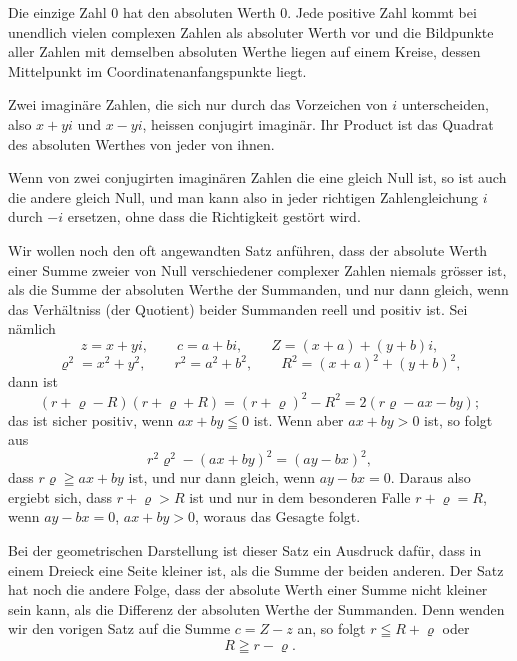 
Die einzige Zahl $0$ hat den absoluten Werth $0$. Jede positive Zahl
kommt bei unendlich vielen complexen Zahlen als absoluter Werth vor und
die Bildpunkte aller Zahlen mit demselben absoluten Werthe liegen auf
einem Kreise, dessen Mittelpunkt im Coordinatenanfangspunkte liegt.

Zwei imaginäre Zahlen, die sich nur durch das Vorzeichen von $i$
unterscheiden, also $x+yi$ und $x-yi$, heissen conjugirt imaginär. Ihr
Product ist das Quadrat des absoluten Werthes von jeder von ihnen.

Wenn von zwei conjugirten imaginären Zahlen die eine gleich Null ist,
so ist auch die andere gleich Null, und man kann also in jeder
richtigen Zahlengleichung $i$ durch $-i$ ersetzen, ohne dass die
Richtigkeit gestört wird.

Wir wollen noch den oft angewandten Satz anführen, dass der absolute
Werth einer Summe zweier von Null verschiedener complexer Zahlen
niemals grösser ist, als die Summe der absoluten Werthe der Summanden,
und nur dann gleich, wenn das Verhältniss (der Quotient) beider
Summanden reell und positiv ist. Sei nämlich
\[
 z=x+yi,
 \qquad c=a+bi,
 \qquad Z=(x+a)+(y+b)i,
\]
\[
 \varrho^2=x^2+y^2,
 \qquad r^2=a^2+b^2,
 \qquad R^2=(x+a)^2+(y+b)^2,
\]
dann ist
\[
 (r+\varrho-R)(r+\varrho+R)
   =(r+\varrho)^2-R^2=2(r\varrho-ax-by);
\]
das ist sicher positiv, wenn $ax+by\leqq 0$ ist. Wenn aber $ax+by>0$
ist, so folgt aus
\[
 r^2\varrho^2-(ax+by)^2=(ay-bx)^2,
\]
dass $r\varrho\geqq ax+by$ ist, und nur dann gleich, wenn $ay-bx=0$.
Daraus also ergiebt sich, dass $r+\varrho>R$ ist und nur in dem
besonderen Falle $r+\varrho=R$, wenn $ay-bx=0$, $ax+by>0$, woraus das
Gesagte folgt.

Bei der geometrischen Darstellung ist dieser Satz ein Ausdruck dafür,
dass in einem Dreieck eine Seite kleiner ist, als die Summe der beiden
anderen. Der Satz hat noch die andere Folge, dass der absolute Werth
einer Summe nicht kleiner sein kann, als die Differenz der absoluten
Werthe der Summanden. Denn wenden wir den vorigen Satz auf die Summe
$c=Z-z$ an, so folgt $r\leqq R+\varrho$ oder
\[
 R\geqq r-\varrho.
\]
